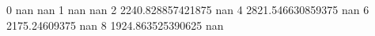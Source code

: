 0 nan nan
1 nan nan
2 2240.828857421875 nan
4 2821.546630859375 nan
6 2175.24609375 nan
8 1924.863525390625 nan
